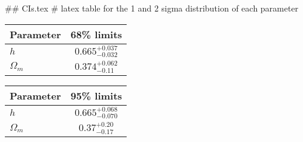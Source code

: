 ## CIs.tex
# latex table for the 1 and 2 sigma distribution of each parameter

\begin{tabular} { l  c}
 Parameter &  68\% limits\\
\hline
{\boldmath$h              $} & $0.665^{+0.037}_{-0.032}   $\\
{\boldmath$\Omega_m       $} & $0.374^{+0.062}_{-0.11}    $\\
\hline
\end{tabular}

\begin{tabular} { l  c}
 Parameter &  95\% limits\\
\hline
{\boldmath$h              $} & $0.665^{+0.068}_{-0.070}   $\\
{\boldmath$\Omega_m       $} & $0.37^{+0.20}_{-0.17}      $\\
\hline
\end{tabular}
